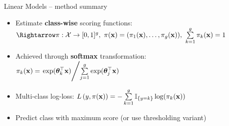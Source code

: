 \begin{vbframe}{Linear Models -- method summary}
\medskip


\medskip


\begin{itemize}
  \item Estimate \textbf{class-wise} scoring functions:
  $\Rightarrow \pi: \Xspace \rightarrow \unitint^g, ~
  \pix = (\pikx[1], \dots, \pikx[g]), ~\sumkg \pikx = 1$
  \item Achieved through \textbf{softmax} transformation: 
  $\pi_{k}(\mathbf{x}) = \left. \exp(\bm{\theta}_k^\top \mathbf{x}) \middle/ \sum\limits_{j=1}^g \exp(\bm{\theta}_j^\top 
  \mathbf{x}) \right.$
  \item Multi-class log-loss: $L\left(y, \pi(\mathbf{x})\right) = - \sum\limits_{k=1}^g \mathbb{I}_{\{y = k\}} \log(\pi_{k}(\mathbf{x}))$
  \item Predict class with maximum score (or use thresholding variant)
\end{itemize}


\end{vbframe}



